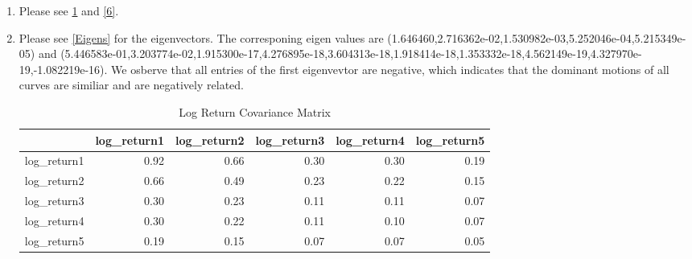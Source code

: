 \documentclass{article}
\begin{document}
\begin{enumerate}
\begin{enumerate}
\begin{figure}
            \end{figure}
        \item Please see \ref{4c} for the plot of the forward curve. 
            \begin{figure}[hbt!]
            \caption{Q4(c)}
            \label{4c}
            \end{figure}
    \end{enumerate}
    \item Please see \ref{5} and \ref{6}.
    \item Please see \ref{Eigens} for the eigenvectors. The corresponing eigen values are
    (1.646460,2.716362e-02,1.530982e-03,5.252046e-04,5.215349e-05) and 
    (5.446583e-01,3.203774e-02,1.915300e-17,4.276895e-18,3.604313e-18,1.918414e-18,1.353332e-18,4.562149e-19,4.327970e-19,-1.082219e-16).
    We osberve that all entries of the first eigenvevtor are negative, which indicates that the dominant motions of all curves are similiar and are negatively related.
    \begin{table}[ht]
    \centering
    \begin{tabular}{rrrrrr}
    \hline 
 & log\_return1 & log\_return2 & log\_return3 & log\_return4 & log\_return5 \\ 
    \hline
log\_return1 & 0.92 & 0.66 & 0.30 & 0.30 & 0.19 \\ 
  log\_return2 & 0.66 & 0.49 & 0.23 & 0.22 & 0.15 \\ 
  log\_return3 & 0.30 & 0.23 & 0.11 & 0.11 & 0.07 \\ 
  log\_return4 & 0.30 & 0.22 & 0.11 & 0.10 & 0.07 \\ 
  log\_return5 & 0.19 & 0.15 & 0.07 & 0.07 & 0.05 \\ 
   \hline
    \end{tabular}
    \caption{Log Return Covariance Matrix}
    \label{5}
    \end{table}


\end{enumerate}
\end{document}
